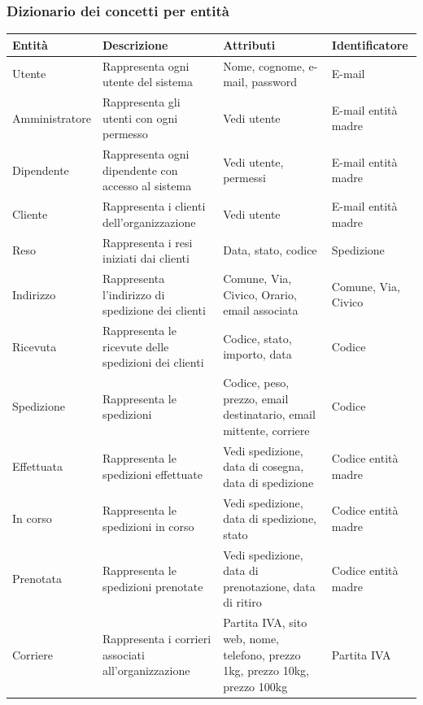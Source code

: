 \subsubsection*{Dizionario dei concetti per entità}
\begin{table}[H]
	\centering
	\begin{tabularx}{\dimexpr{}\arrayrulewidth}{|*{4}{Y|}} %
		\hline
		\textbf{Entità} & \textbf{Descrizione} & \textbf{Attributi} & \textbf{Identificatore} \\ 
    \hline
     Utente & Rappresenta ogni utente del sistema & Nome, cognome, e-mail, password & E-mail\\
    \hline
     Amministratore & Rappresenta gli utenti con ogni permesso & Vedi utente & E-mail entità madre \\
    \hline
     Dipendente & Rappresenta ogni dipendente con accesso al sistema & Vedi utente, permessi & E-mail entità madre\\
    \hline
		 Cliente & Rappresenta i clienti dell'organizzazione & Vedi utente & E-mail entità madre \\
		\hline 
		 Reso & Rappresenta i resi iniziati dai clienti & Data, stato, codice & Spedizione \\
		\hline
		Indirizzo & Rappresenta l'indirizzo di spedizione dei clienti & Comune, Via, Civico, Orario, email associata & Comune, Via, Civico \\ 
		\hline
		Ricevuta & Rappresenta le ricevute delle spedizioni dei clienti & Codice, stato, importo, data & Codice \\
		\hline
		Spedizione & Rappresenta le spedizioni & Codice, peso, prezzo, email destinatario, email mittente, corriere & Codice \\ 
		\hline
		Effettuata & Rappresenta le spedizioni effettuate & Vedi spedizione, data di cosegna, data di spedizione & Codice entità madre \\
		\hline
		In corso & Rappresenta le spedizioni in corso & Vedi spedizione, data di spedizione, stato & Codice entità madre \\
		\hline
		Prenotata & Rappresenta le spedizioni prenotate & Vedi spedizione, data di prenotazione, data di ritiro & Codice entità madre \\
		\hline
		Corriere & Rappresenta i corrieri associati all'organizzazione & Partita IVA, sito web, nome, telefono, prezzo 1kg, prezzo 10kg, prezzo 100kg & Partita IVA \\
		\hline 
	\end{tabularx}
\end{table}


